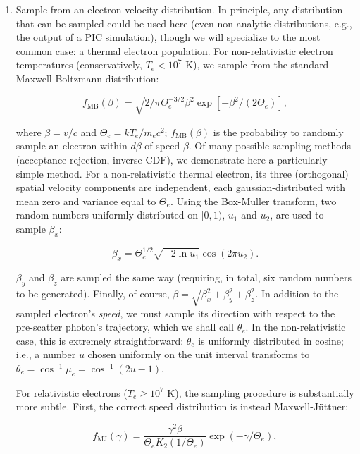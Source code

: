 \documentclass[letterpaper]{article}
\begin{document}
\begin{enumerate}

\item Sample from an electron velocity distribution. In principle, any distribution that can be sampled could be used here (even non-analytic distributions, e.g., the output of a PIC simulation), though we will specialize to the most common case: a thermal electron population. For non-relativistic electron temperatures (conservatively, $T_e < 10^7$ K), we sample from the standard Maxwell-Boltzmann distribution:

\begin{equation}
f_\mathrm{MB}(\beta) = \sqrt{2/\pi} \Theta_e^{-3/2} \beta^2 \exp[-\beta^2/(2\Theta_e)],
\end{equation}

\noindent where $\beta = v/c$ and $\Theta_e = kT_e/m_e c^2$; $f_\mathrm{MB}(\beta)$ is the probability to randomly sample an electron within $d\beta$ of speed $\beta$. Of many possible sampling methods (acceptance-rejection, inverse CDF), we demonstrate here a particularly simple method. For a non-relativistic thermal electron, its three (orthogonal) spatial velocity components are independent, each gaussian-distributed with mean zero and variance equal to $\Theta_e$. Using the Box-Muller transform, two random numbers uniformly distributed on $[0, 1)$, $u_1$ and $u_2$, are used to sample $\beta_x$:

\begin{equation}
\beta_x = \Theta_e^{1/2} \sqrt{-2 \ln u_1} \cos (2 \pi u_2).
\end{equation}

\noindent $\beta_y$ and $\beta_z$ are sampled the same way (requiring, in total, six random numbers to be generated). Finally, of course, $\beta = \sqrt{\beta_x^2 + \beta_y^2 + \beta_z^2}$. In addition to the sampled electron's \emph{speed}, we must sample its direction with respect to the pre-scatter photon's trajectory, which we shall call $\theta_e$. In the non-relativistic case, this is extremely straightforward: $\theta_e$ is uniformly distributed in cosine; i.e., a number $u$ chosen uniformly on the unit interval transforms to $\theta_e = \cos^{-1} \mu_e = \cos^{-1} (2 u - 1)$.

For relativistic electrons ($T_e \geq 10^7$ K), the sampling procedure is substantially more subtle. First, the correct speed distribution is instead Maxwell-J\"{u}ttner:

\begin{equation}
f_\mathrm{MJ}(\gamma) = \frac{\gamma^2 \beta}{\Theta_e K_2(1/\Theta_e)} \exp(-\gamma/\Theta_e),
\end{equation}


\end{enumerate}
\end{document}
